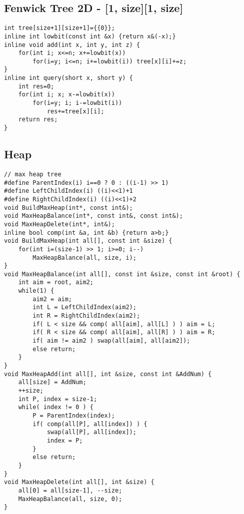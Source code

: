 \documentclass[11pt,twocolumn,a4paper]{article}
\begin{document}
\subsection{Fenwick Tree 2D - [1, size][1, size]}
\begin{lstlisting}[label=Fenwick Tree 2D]
int tree[size+1][size+1]={{0}};
inline int lowbit(const int &x) {return x&(-x);}
inline void add(int x, int y, int z) {
	for(int i; x<=n; x+=lowbit(x))
		for(i=y; i<=n; i+=lowbit(i)) tree[x][i]+=z;
}
inline int query(short x, short y) {
	int res=0;
	for(int i; x; x-=lowbit(x))
		for(i=y; i; i-=lowbit(i))
			res+=tree[x][i];
	return res;
}
\end{lstlisting}

\newpage
\subsection{Heap}
\begin{lstlisting}[label=Heap]
// max heap tree
#define ParentIndex(i) i==0 ? 0 : ((i-1) >> 1)
#define LeftChildIndex(i) ((i)<<1)+1
#define RightChildIndex(i) ((i)<<1)+2 
void BuildMaxHeap(int*, const int&);
void MaxHeapBalance(int*, const int&, const int&);
void MaxHeapDelete(int*, int&); 
inline bool comp(int &a, int &b) {return a>b;}
void BuildMaxHeap(int all[], const int &size) {
	for(int i=(size-1) >> 1; i>=0; i--)
		MaxHeapBalance(all, size, i);
}
void MaxHeapBalance(int all[], const int &size, const int &root) {
	int aim = root, aim2;
	while(1) {
		aim2 = aim;
		int L = LeftChildIndex(aim2);
		int R = RightChildIndex(aim2);
		if( L < size && comp( all[aim], all[L] ) ) aim = L;
		if( R < size && comp( all[aim], all[R] ) ) aim = R;
		if( aim != aim2 ) swap(all[aim], all[aim2]);
		else return;
	}
}
void MaxHeapAdd(int all[], int &size, const int &AddNum) {
	all[size] = AddNum;
	++size;
	int P, index = size-1;
	while( index != 0 ) {
		P = ParentIndex(index);
		if( comp(all[P], all[index]) ) {
			swap(all[P], all[index]);
			index = P;
		}
		else return;
	}
}
void MaxHeapDelete(int all[], int &size) {
	all[0] = all[size-1], --size;
	MaxHeapBalance(all, size, 0);
}
\end{lstlisting}

\newpage
\end{document}
